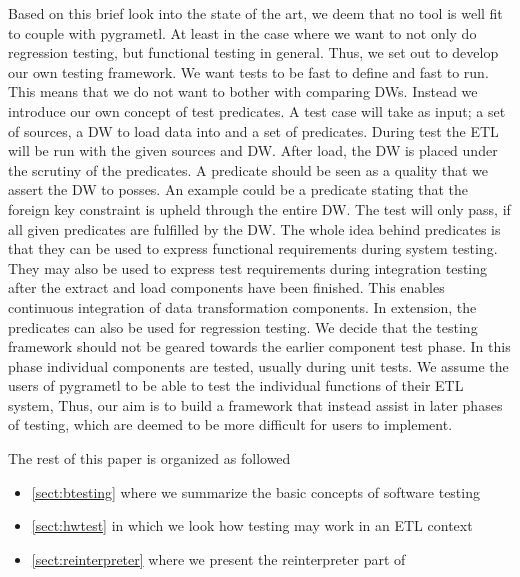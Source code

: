 Based on this brief look into the state of the art, we deem that no tool is well fit to couple with pygrametl. At least in the case where we want to not only do regression testing, but functional testing in general. Thus, we set out to develop our own testing framework. We want tests to be fast to define and fast to run. This means that we do not want to bother with comparing DWs. Instead we introduce our own concept of test predicates. A test case will take as input; a set of sources, a DW to load data into and a set of predicates. During test the ETL will be run with the given sources and DW. After load, the DW  is placed under the scrutiny of the predicates. A predicate should be seen as a quality that we assert the DW to posses. An example could be a predicate stating that the foreign key constraint is upheld through the entire DW. The test will only pass, if all given predicates are fulfilled by the DW. The whole idea behind predicates is that they can be used to express functional requirements during system testing. They may also be used to express test requirements during integration testing after the extract and load components have been finished. This enables continuous integration of data transformation components. In extension, the predicates can also be used for regression testing. We decide that the testing framework should not be geared towards the earlier component test phase. In this phase individual components are tested, usually during unit tests. We assume the users of pygrametl to be able to test the individual functions of their ETL system, Thus, our aim is to build a framework that instead assist in later phases of testing, which are deemed to be more difficult for users to implement. 

The rest of this paper is organized as followed
\begin{itemize}
	\item{\cref{sect:btesting} where we summarize the basic concepts of software testing}
	\item{\cref{sect:hwtest} in which we look how testing may work in an ETL context}
	\item{\cref{sect:reinterpreter} where we present the reinterpreter part of \FW}
\end{itemize}




